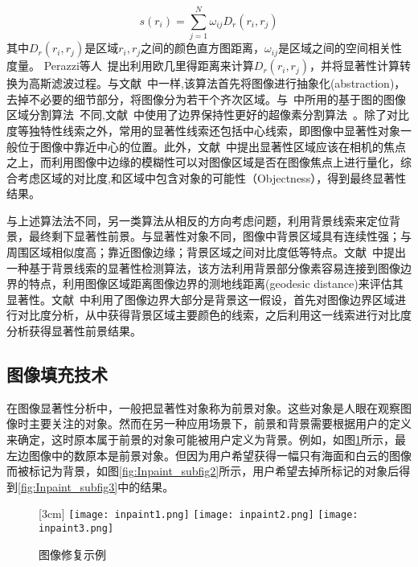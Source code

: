 $$s(r_{i})=\sum_{j=1}^{N}\omega_{ij}D_{r}(r_{i},r_{j})$$
其中$D_{r}(r_{i},r_{j})$是区域$r_{i},r_{j}$之间的颜色直方图距离，$\omega_{ij}$是区域之间的空间相关性度量。
Perazzi等人~\cite{saliencyFilter}提出利用欧几里得距离来计算$D_{r}(r_{i},r_{j})$，并将显著性计算转换为高斯滤波过程。与文献~\cite{ChengPAMI}中一样,该算法首先将图像进行抽象化(abstraction)，去掉不必要的细节部分，将图像分为若干个齐次区域。与~\cite{ChengPAMI}中所用的基于图的图像区域分割算法~\cite{graphseg}不同,文献~\cite{saliencyFilter}中使用了边界保持性更好的超像素分割算法~\cite{SLIC}。除了对比度等独特性线索之外，常用的显著性线索还包括中心线索，即图像中显著性对象一般位于图像中靠近中心的位置。此外，文献~中提出显著性区域应该在相机的焦点之上，而利用图像中边缘的模糊性可以对图像区域是否在图像焦点上进行量化，综合考虑区域的对比度,和区域中包含对象的可能性（Objectness），得到最终显著性结果。\par
与上述算法法不同，另一类算法从相反的方向考虑问题，利用背景线索来定位背景，最终剩下显著性前景。与显著性对象不同，图像中背景区域具有连续性强；与周围区域相似度高；靠近图像边缘；背景区域之间对比度低等特点。文献~\cite{geodesicDistance}中提出一种基于背景线索的显著性检测算法，该方法利用背景部分像素容易连接到图像边界的特点，利用图像区域距离图像边界的测地线距离(geodesic distance)来评估其显著性。文献~中利用了图像边界大部分是背景这一假设，首先对图像边界区域进行对比度分析，从中获得背景区域主要颜色的线索，之后利用这一线索进行对比度分析获得显著性前景结果。

\subsection{图像填充技术}
\label{sec:imageInpainting}
在图像显著性分析中，一般把显著性对象称为前景对象。这些对象是人眼在观察图像时主要关注的对象。然而在另一种应用场景下，前景和背景需要根据用户的定义来确定，这时原本属于前景的对象可能被用户定义为背景。例如，如图\ref{fig:inpainting}所示，最左边图像中的数原本是前景对象。但因为用户希望获得一幅只有海面和白云的图像而被标记为背景，如图\ref{fig:Inpaint_subfig2}所示，用户希望去掉所标记的对象后得到\ref{fig:Inpaint_subfig3}中的结果。

\begin{figure}[h]
  \centering%
  [3cm] %
    {\texttt{[image: inpaint1.png]}}%
  \hspace{4em}%
     {\texttt{[image: inpaint2.png]}}
  \hspace{1em}%
    {\texttt{[image: inpaint3.png]}}
  \caption{图像修复示例~\cite{Criminisi04regionfilling}}
  \label{fig:inpainting}
\end{figure}

